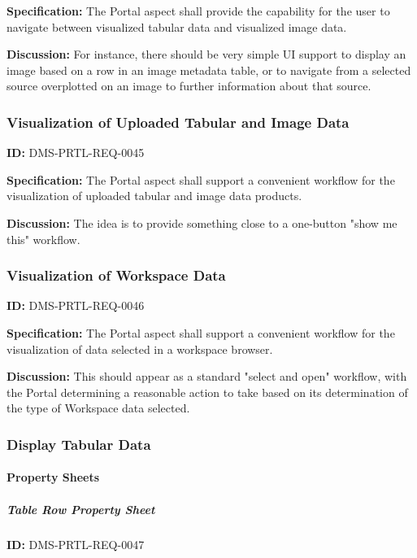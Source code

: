\documentclass[SE,toc]{lsstdoc}
\begin{document}
\textbf{Specification:}
The Portal aspect shall provide the capability for the user to navigate between visualized tabular data and visualized image data.

\textbf{Discussion:}
For instance, there should be very simple UI support to display an image based on a row in an image metadata table, or to navigate from a selected source overplotted on an image to further information about that source.

\subsubsection{Visualization of Uploaded Tabular and Image Data}

\label{DMS-PRTL-REQ-0045}
\textbf{ID:} DMS-PRTL-REQ-0045

\textbf{Specification:}
The Portal aspect shall support a convenient workflow for the visualization of uploaded tabular and image data products.

\textbf{Discussion:}
The idea is to provide something close to a one-button "show me this" workflow.

\subsubsection{Visualization of Workspace Data}

\label{DMS-PRTL-REQ-0046}
\textbf{ID:} DMS-PRTL-REQ-0046

\textbf{Specification:}
The Portal aspect shall support a convenient workflow for the visualization of data selected in a workspace browser.

\textbf{Discussion:}
This should appear as a standard "select and open" workflow, with the Portal determining a reasonable action to take based on its determination of the type of Workspace data selected.

\subsubsection{Display Tabular Data}

\paragraph{Property Sheets}\hfill  %

\subparagraph{Table Row Property Sheet}\hfill  %

\label{DMS-PRTL-REQ-0047}
\textbf{ID:} DMS-PRTL-REQ-0047
\end{document}
